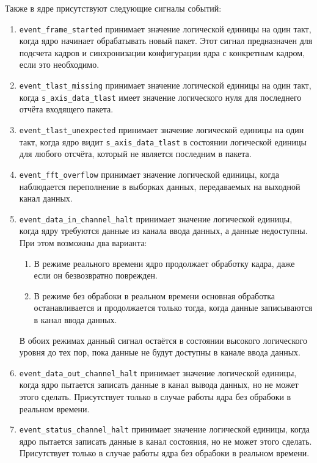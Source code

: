 Также в ядре присутствуют следующие сигналы событий:

\begin{enumerate}
	\item \verb|event_frame_started| принимает значение логической единицы на один такт, когда ядро начинает обрабатывать новый пакет. Этот сигнал предназначен для подсчета кадров и синхронизации конфигурации ядра с конкретным кадром, если это необходимо.
	\item \verb|event_tlast_missing| принимает значение логической единицы на один такт, когда \verb|s_axis_data_tlast| имеет значение логического нуля для последнего отчёта входящего пакета.
	\item \verb|event_tlast_unexpected| принимает значение логической единицы на один такт, когда ядро видит \verb|s_axis_data_tlast| в состоянии логической единицы для любого отсчёта, который не является последним в пакета. 
	\item \verb|event_fft_overflow| принимает значение логической единицы, когда наблюдается переполнение в выборках данных, передаваемых на выходной канал данных. 
	\item \verb|event_data_in_channel_halt| принимает значение логической единицы, когда ядру требуются данные из канала ввода данных, а данные недоступны. При этом возможны два варианта:
	\begin{enumerate}
		\item В режиме реального времени ядро продолжает обработку кадра, даже если он безвозвратно поврежден.
		\item В режиме без обрабоки в реальном времени основная обработка останавливается и продолжается только тогда, когда данные записываются в канал ввода данных.
	\end{enumerate}
	В обоих режимах данный сигнал остаётся в состоянии высокого логического уровня до тех пор, пока данные не будут доступны в канале ввода данных.
	\item \verb|event_data_out_channel_halt| принимает значение логической единицы, когда ядро пытается записать данные в канал вывода данных, но не может этого сделать. Присутствует только в случае работы ядра без обрабоки в реальном времени. 
	\item \verb|event_status_channel_halt| принимает значение логической единицы, когда ядро пытается записать данные в канал состояния, но не может этого сделать. Присутствует только в случае работы ядра без обрабоки в реальном времени. 
\end{enumerate}

